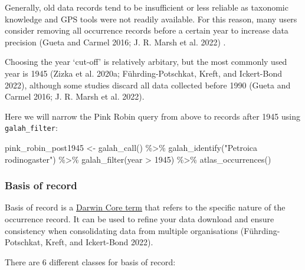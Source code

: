 \documentclass[
  letterpaper,
  DIV=11,
  numbers=noendperiod,
  oneside]{scrreprt}
\newenvironment{Shaded}{\begin{snugshade}}{\end{snugshade}}
\newcommand{\DecValTok}[1]{\textcolor[rgb]{0.68,0.00,0.00}{#1}}
\newcommand{\FunctionTok}[1]{\textcolor[rgb]{0.28,0.35,0.67}{#1}}
\newcommand{\NormalTok}[1]{\textcolor[rgb]{0.00,0.23,0.31}{#1}}
\newcommand{\OtherTok}[1]{\textcolor[rgb]{0.00,0.23,0.31}{#1}}
\newcommand{\SpecialCharTok}[1]{\textcolor[rgb]{0.37,0.37,0.37}{#1}}
\newcommand{\StringTok}[1]{\textcolor[rgb]{0.13,0.47,0.30}{#1}}
\begin{document}
Generally, old data records tend to be insufficient or less reliable as
taxonomic knowledge and GPS tools were not readily available. For this
reason, many users consider removing all occurrence records before a
certain year to increase data precision (Gueta and Carmel 2016; J. R.
Marsh et al. 2022) .

Choosing the year `cut-off' is relatively arbitary, but the most
commonly used year is 1945 (Zizka et al. 2020a; Führding-Potschkat,
Kreft, and Ickert-Bond 2022), although some studies discard all data
collected before 1990 (Gueta and Carmel 2016; J. R. Marsh et al. 2022).

Here we will narrow the Pink Robin query from above to records after
1945 using \texttt{galah\_filter}:

\begin{Shaded}
\begin{Highlighting}[]
\NormalTok{pink\_robin\_post1945 }\OtherTok{\textless{}{-}} \FunctionTok{galah\_call}\NormalTok{() }\SpecialCharTok{\%\textgreater{}\%} 
  \FunctionTok{galah\_identify}\NormalTok{(}\StringTok{"Petroica rodinogaster"}\NormalTok{) }\SpecialCharTok{\%\textgreater{}\%} 
  \FunctionTok{galah\_filter}\NormalTok{(year }\SpecialCharTok{\textgreater{}} \DecValTok{1945}\NormalTok{) }\SpecialCharTok{\%\textgreater{}\%} 
  \FunctionTok{atlas\_occurrences}\NormalTok{()}
\end{Highlighting}
\end{Shaded}

\hypertarget{basis-of-record}{%
\subsubsection{Basis of record}\label{basis-of-record}}

Basis of record is a
\href{https://dwc.tdwg.org/terms/\#dwc:basisOfRecord}{Darwin Core term}
that refers to the specific nature of the occurrence record. It can be
used to refine your data download and ensure consistency when
consolidating data from multiple organisations (Führding-Potschkat,
Kreft, and Ickert-Bond 2022).

There are 6 different classes for basis of record:
\end{document}
